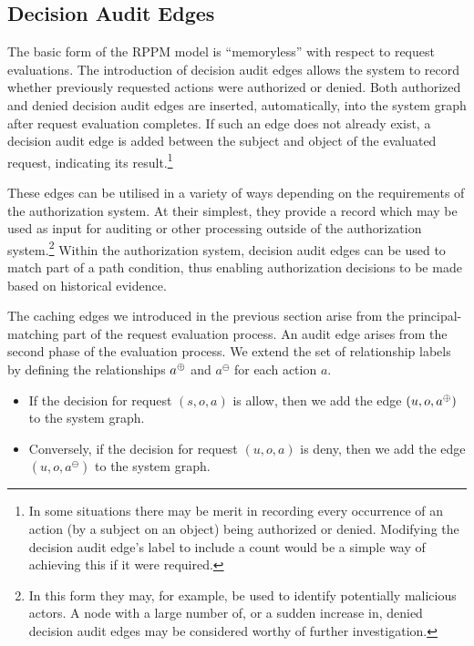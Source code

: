 \documentclass{article}
\newcommand{\auditd}[1]{\ensuremath{#1^\ominus}}
\begin{document}
\subsection{Decision Audit Edges}\label{sec:extended_typed_edges:decision_audit_edges}
The basic form of the RPPM model is ``memoryless'' with respect to request evaluations.
The introduction of decision audit edges allows the system to record whether previously requested actions were authorized or denied.
Both authorized and denied decision audit edges are inserted, automatically, into the system graph after request evaluation completes.
If such an edge does not already exist, a decision audit edge is added between the subject and object of the evaluated request, indicating its result.\footnote{In some situations there may be merit in recording every occurrence of an action (by a subject on an object) being authorized or denied. Modifying the decision audit edge's label to include a count would be a simple way of achieving this if it were required.}

These edges can be utilised in a variety of ways depending on the requirements of the authorization system.
At their simplest, they provide a record which may be used as input for auditing or other processing outside of the authorization system.\footnote{In this form they may, for example, be used to identify potentially malicious actors.
A node with a large number of, or a sudden increase in, denied decision audit edges may be considered worthy of further investigation.}
Within the authorization system, decision audit edges can be used to match part of a path condition, thus enabling authorization decisions to be made based on historical evidence.

The caching edges we introduced in the previous section arise from the principal-matching part of the request evaluation process.
An audit edge arises from the second phase of the evaluation process.
We extend the set of relationship labels by defining the relationships  $a^\oplus$ and $\auditd{a}$ for each action $a$.
\begin{itemize}
 \item If the decision for request $(s,o,a)$ is allow, then we add the edge $(u,o,a^\oplus)$ to the system graph.
 \item Conversely, if the decision for request $(u,o,a)$ is deny, then we add the edge $(u,o,\auditd{a})$ to the system graph.
\end{itemize}
\end{document}
